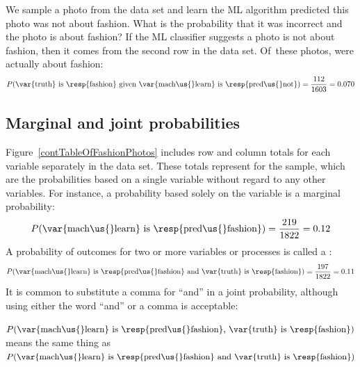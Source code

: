 \begin{examplewrap}
\begin{nexample}{We sample a photo from the data set
    and learn the ML algorithm predicted this photo
    was not about fashion.
    What is the probability that it was incorrect and
    the photo is about fashion?}
  If the ML classifier suggests a photo is not about fashion,
  then it comes from the second row in the data set.
  Of~these \fashNA{} photos, \fashNY{} were actually
  about fashion:
\begin{align*}
P(\text{\var{truth} is \resp{fashion}
    given \var{mach\us{}learn} is \resp{pred\us{}not}})
  = \frac{\fashNY{}}{\fashNA{}}
  = 0.070
\end{align*}
\end{nexample}
\end{examplewrap}

\subsection{Marginal and joint probabilities}
\label{marginalAndJointProbabilities}


Figure~\ref{contTableOfFashionPhotos} includes row and
column totals for each variable separately in the
 data set.
These totals represent
for the sample, which are the probabilities based on a
single variable without regard to any other variables.
For instance, a probability based solely on the
 variable is a marginal probability:
\begin{align*}
P(\text{\var{mach\us{}learn} is \resp{pred\us{}fashion}})
    = \frac{\fashYA{}}{\fashN{}}
    = 0.12
\end{align*}
A probability of outcomes for two or more variables
or processes is called a
:
\begin{align*}
P(\text{\var{mach\us{}learn} is \resp{pred\us{}fashion}
    and \var{truth} is \resp{fashion}})
  = \frac{\fashYY{}}{\fashN{}}
  = 0.11
\end{align*}
It is common to substitute a comma for ``and'' in a joint
probability, although using either the word ``and'' or a
comma is acceptable:
\begin{center}
$P(\text{\var{mach\us{}learn} is \resp{pred\us{}fashion},
    \var{truth} is \resp{fashion}})$ \\[2mm]
means the same thing as \\[2mm]
$P(\text{\var{mach\us{}learn} is \resp{pred\us{}fashion}
    and \var{truth} is \resp{fashion}})$
\end{center}

